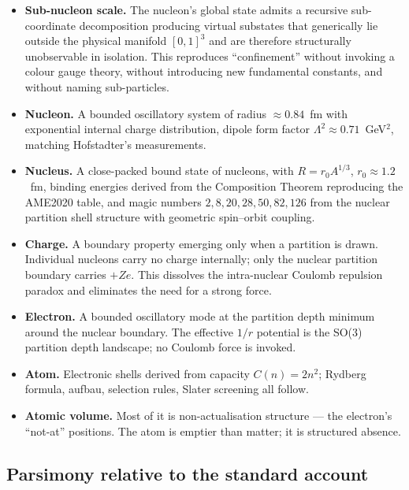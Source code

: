 \documentclass[11pt,a4paper]{article}
\theoremstyle{definition}
\theoremstyle{remark}
\begin{document}
\begin{itemize}[leftmargin=2em,itemsep=2pt]
\item \textbf{Sub-nucleon scale.} The nucleon's global state admits a recursive sub-coordinate decomposition producing virtual substates that generically lie outside the physical manifold $[0,1]^3$ and are therefore structurally unobservable in isolation. This reproduces ``confinement'' without invoking a colour gauge theory, without introducing new fundamental constants, and without naming sub-particles.
\item \textbf{Nucleon.} A bounded oscillatory system of radius $\approx 0.84$~fm with exponential internal charge distribution, dipole form factor $\Lambda^2 \approx 0.71$~GeV$^2$, matching Hofstadter's measurements.
\item \textbf{Nucleus.} A close-packed bound state of nucleons, with $R = r_0 A^{1/3}$, $r_0\approx 1.2$~fm, binding energies derived from the Composition Theorem reproducing the AME2020 table, and magic numbers $2, 8, 20, 28, 50, 82, 126$ from the nuclear partition shell structure with geometric spin--orbit coupling.
\item \textbf{Charge.} A boundary property emerging only when a partition is drawn. Individual nucleons carry no charge internally; only the nuclear partition boundary carries $+Ze$. This dissolves the intra-nuclear Coulomb repulsion paradox and eliminates the need for a strong force.
\item \textbf{Electron.} A bounded oscillatory mode at the partition depth minimum around the nuclear boundary. The effective $1/r$ potential is the SO(3) partition depth landscape; no Coulomb force is invoked.
\item \textbf{Atom.} Electronic shells derived from capacity $C(n) = 2n^2$; Rydberg formula, aufbau, selection rules, Slater screening all follow.
\item \textbf{Atomic volume.} Most of it is non-actualisation structure --- the electron's ``not-at'' positions. The atom is emptier than matter; it is structured absence.
\end{itemize}

\subsection{Parsimony relative to the standard account}
\end{document}
